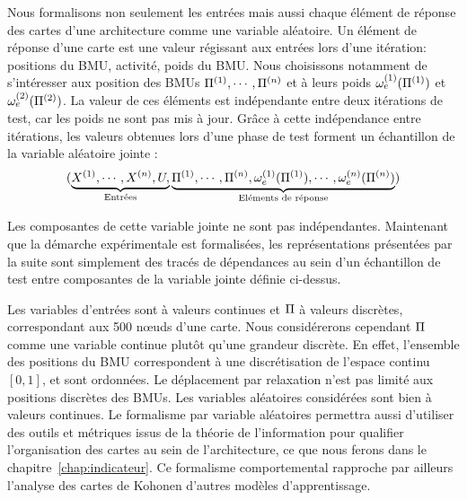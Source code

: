 \documentclass[../main]{subfiles}
\begin{document}
Nous formalisons non seulement les entrées mais aussi chaque élément de réponse des cartes d'une architecture comme une variable aléatoire.
Un élément de réponse d'une carte est une valeur régissant aux entrées lors d'une itération: positions du BMU, activité, poids du BMU.
Nous choisissons notamment de s'intéresser aux position des BMUs $\Pi^{({1})}, \cdots, \Pi^{({n})}$ et à leurs poids $\omega_{e}^{({1})}(\Pi^{({1})})$ et $\omega_{e}^{({2})}(\Pi^{({2})})$.
La valeur de ces éléments est indépendante entre deux itérations de test, car les poids ne sont pas mis à jour.
Grâce à cette indépendance entre itérations, les valeurs obtenues lors d'une phase de test forment un échantillon de la variable aléatoire jointe : 
$$(\underbrace{X^{({1})}, \cdots, X^{({n})}, U,}_{\text{Entrées}} \underbrace{\Pi^{({1})}, \cdots, \Pi^{({n})}, \omega_e^{({1})}(\Pi^{({1})}), \cdots, \omega_e^{({n})}(\Pi^{({n})})}_{\text{Eléments de réponse}})$$

Les composantes de cette variable jointe ne sont pas indépendantes. Maintenant que la démarche expérimentale est formalisées, les représentations présentées par la suite sont simplement des tracés de dépendances au sein d'un échantillon de test entre composantes de la variable jointe définie ci-dessus.

Les variables d'entrées sont à valeurs continues et $\Pi$ à valeurs discrètes, correspondant aux 500 n\oe{}uds d'une carte. Nous considérerons cependant $\Pi$ comme une variable continue plutôt qu'une grandeur discrète. En effet, l'ensemble des positions du BMU correspondent à une discrétisation de l'espace continu $[0,1]$, et sont ordonnées. Le déplacement par relaxation n'est pas limité aux positions discrètes des BMUs. Les variables aléatoires considérées sont bien à valeurs continues. 
Le formalisme par variable aléatoires permettra aussi d'utiliser des outils et métriques issus de la théorie de l'information pour qualifier l'organisation des cartes au sein de l'architecture, ce que nous ferons dans le chapitre~\ref{chap:indicateur}.
Ce formalisme comportemental rapproche par ailleurs l'analyse des cartes de Kohonen d'autres modèles d'apprentissage.
\end{document}
